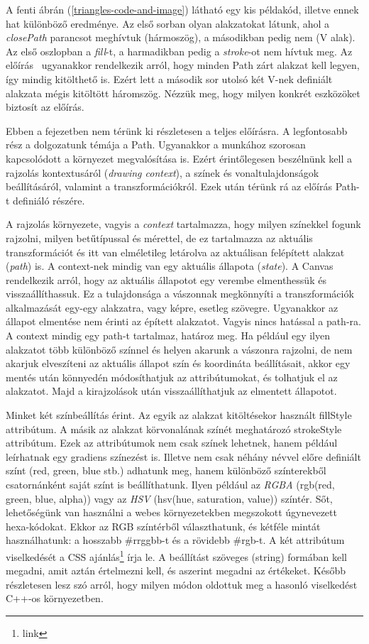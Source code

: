 \documentclass[12pt]{report}
\theoremstyle{definition}
\newcommand{\inenglish}[1]{\textsl{#1}}
\newcommand{\func}[1]{{\textsf{\footnotesize{#1}}}}
\begin{document}
A fenti ábrán (\ref{triangles-code-and-image}) látható egy kis példakód,
illetve ennek hat különböző eredménye. Az első sorban olyan alakzatokat látunk,
ahol a \emph{closePath} parancsot meghívtuk (hármoszög), a másodikban pedig nem
(V alak). Az első oszlopban a \emph{fill}-t, a harmadikban pedig a
\emph{stroke}-ot nem hívtuk meg. Az előírás~\cite{Cabanier:14:HCC} ugyanakkor
rendelkezik arról, hogy minden Path zárt alakzat kell legyen, így mindig
kitölthető is. Ezért lett a második sor utolsó két V-nek definiált alakzata
mégis kitöltött háromszög. Nézzük meg, hogy milyen konkrét eszközöket biztosít
az előírás.

Ebben a fejezetben nem térünk ki részletesen a teljes előírásra. A legfontosabb
rész a dolgozatunk témája a Path. Ugyanakkor a munkához szorosan kapcsolódott a
környezet megvalósítása is. Ezért érintőlegesen beszélnünk kell a rajzolás
kontextusáról (\inenglish{drawing context}), a színek és vonaltulajdonságok
beállításáról, valamint a transzformációkról. Ezek után térünk rá az előírás
Path-t definiáló részére.

A rajzolás környezete, vagyis a \emph{context} tartalmazza, hogy milyen
színekkel fogunk rajzolni, milyen betűtípussal és mérettel, de ez tartalmazza
az aktuális transzformációt és itt van elméletileg letárolva az aktuálisan
felépített alakzat (\inenglish{path}) is. A context-nek mindig van egy aktuális
állapota (\inenglish{state}). A Canvas rendelkezik arról, hogy az aktuális
állapotot egy verembe elmenthessük és visszaállíthassuk. Ez a tulajdonsága a
vászonnak megkönnyíti a transzformációk alkalmazását egy-egy alakzatra, vagy
képre, esetleg szövegre. Ugyanakkor az állapot elmentése nem érinti az épített
alakzatot. Vagyis nincs hatással a path-ra. A context mindig egy path-t
tartalmaz, határoz meg. Ha például egy ilyen alakzatot több különböző színnel
és helyen akarunk a vászonra rajzolni, de nem akarjuk elveszíteni az aktuális
állapot szín és koordináta beállításait, akkor egy mentés után könnyedén
módosíthatjuk az attribútumokat, és tolhatjuk el az alakzatot. Majd a
kirajzolások után visszaállíthatjuk az elmentett állapotot.

Minket két színbeállítás érint. Az egyik az alakzat kitöltésekor használt
\func{fillStyle} attribútum. A másik az alakzat körvonalának színét meghatározó
\func{strokeStyle} attribútum. Ezek az attribútumok nem csak színek lehetnek,
hanem például leírhatnak egy gradiens színezést is. Illetve nem csak néhány
névvel előre definiált színt (\func{red}, \func{green}, \func{blue} stb.)
adhatunk meg, hanem különböző színterekből csatornánként saját színt is
beállíthatunk. Ilyen például az \emph{RGBA} (\func{rgb(red, green, blue,
alpha)}) vagy az \emph{HSV} (\func{hsv(hue, saturation, value)}) színtér. Sőt,
lehetőségünk van használni a webes környezetekben megszokott úgynevezett
hexa-kódokat. Ekkor az RGB színtérből választhatunk, és kétféle mintát
használhatunk: a hosszabb \func{\#rrggbb}-t és a rövidebb \func{\#rgb}-t. A két
attribútum viselkedését a CSS ajánlás\footnote{link} írja le. A beállítást
szöveges (\func{string}) formában kell megadni, amit aztán értelmezni kell, és
aszerint megadni az értékeket. Később részletesen lesz szó arról, hogy
milyen módon oldottuk meg a hasonló viselkedést C++-os környezetben.
\end{document}
